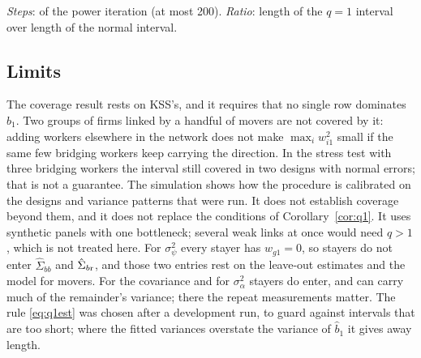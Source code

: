 \begin{table}[t]\centering\footnotesize\setlength{\tabcolsep}{4.5pt}
\caption{The leading direction and the two 95\% intervals on the Veneto designs}\label{tab:q1real}
\begin{minipage}{0.97\textwidth}\footnotesize\smallskip
\emph{Steps}: of the power iteration (at most 200). \emph{Ratio}: length of the $q=1$ interval over length of the
normal interval.
\end{minipage}
\end{table}

\subsection{Limits}

The coverage result rests on KSS's, and it requires that no single row dominates $\hat b_1$. Two groups of
firms linked by a handful of movers are not covered by it: adding workers elsewhere in the network does not
make $\max_iw_{i1}^2$ small if the same few bridging workers keep carrying the direction. In the stress test
with three bridging workers the interval still covered in two designs with normal errors; that is not a
guarantee. The simulation shows how the procedure is calibrated on the designs and variance patterns that were
run. It does not establish coverage beyond them, and it does not replace the conditions of
Corollary~\ref{cor:q1}. It uses synthetic panels with one bottleneck; several weak links at once would need
$q>1$, which is not treated here. For $\sigma^2_\psi$ every stayer has $w_{g1}=0$, so stayers do not enter $\hat\Sigma_{bb}$ and
$\hat\Sigma_{b{\rm r}}$, and those two entries rest on the leave-out estimates and the model for movers. For the
covariance and for $\sigma^2_\alpha$ stayers do enter, and can carry much of the remainder's variance; there the
repeat measurements matter. The rule \eqref{eq:q1est} was chosen after a development run, to guard against
intervals that are too short; where the fitted variances overstate the variance of $\hat b_1$ it gives away
length.

